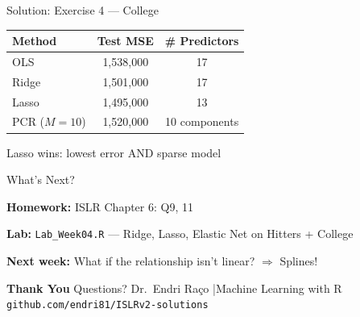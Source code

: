 \documentclass[aspectratio=169, 11pt]{beamer}
\begin{document}
\begin{frame}{Solution: Exercise 4 --- College}
\begin{center}
\begin{tabular}{lcc}
\toprule
Method & Test MSE & \# Predictors \\
\midrule
OLS & 1,538,000 & 17 \\
Ridge & 1,501,000 & 17 \\
\textcolor{softgreen}{Lasso} & \textcolor{softgreen}{1,495,000} & \textcolor{softgreen}{13} \\
PCR ($M=10$) & 1,520,000 & 10 components \\
\bottomrule
\end{tabular}
\end{center}
Lasso wins: lowest error AND sparse model
\end{frame}

\begin{frame}{What's Next?}
\begin{center}
\end{center}
\textbf{Homework:} ISLR Chapter 6: Q9, 11

\textbf{Lab:} \texttt{Lab\_Week04.R} --- Ridge, Lasso, Elastic Net on Hitters + College

\textbf{Next week:} What if the relationship isn't linear? $\Rightarrow$ Splines!
\end{frame}

\begin{frame}{}
\centering\vspace{2cm}
{\Huge\textbf{Thank You}}
\vspace{1em}
{\Large Questions?}
\vspace{1.5em}
{\large Dr.\ Endri Ra\c{c}o \quad|\quad Machine Learning with R}
\vspace{0.5em}
{\normalsize \texttt{github.com/endri81/ISLRv2-solutions}}
\end{frame}
\end{document}
